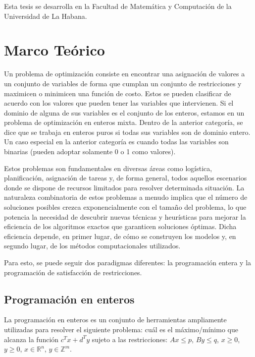 \documentclass[12pt]{report}
\begin{document}
Esta tesis se desarrolla en la Facultad de Matemática y Computación de la Universidad de La Habana.  \\

\chapter{Marco Teórico}

Un problema de optimización consiste en encontrar una asignación de valores a un conjunto de variables de forma que cumplan un conjunto de restricciones y maximicen o minimicen una función de costo. Estos se pueden clasificar de acuerdo con los valores que pueden tener las variables que intervienen. Si el dominio de alguna de sus variables es el conjunto de los enteros, estamos en un problema de optimización en enteros mixta. Dentro de la anterior categoría, se dice que se trabaja en enteros puros si todas sus variables son de dominio entero. Un caso especial en la anterior categoría es cuando todas las variables son binarias (pueden adoptar solamente 0 o 1 como valores).

Estos problemas son fundamentales en diversas áreas como logística, planificación, asignación de tareas y, de forma general, todos aquellos escenarios donde se dispone de recursos limitados para resolver determinada situación. La naturaleza combinatoria de estos problemas a menudo implica que el número de soluciones posibles crezca exponencialmente con el tamaño del problema, lo que potencia la necesidad de descubrir nuevas técnicas y heurísticas para mejorar la eficiencia de los algoritmos exactos que garanticen soluciones óptimas. Dicha eficiencia depende, en primer lugar, de cómo se construyen los modelos y, en segundo lugar, de los métodos computacionales utilizados. 

Para esto, se puede seguir dos paradigmas diferentes: la programación entera y la programación de satisfacción de restricciones.

\section{Programación en enteros}

La programación en enteros es un conjunto de herramientas ampliamente utilizadas para resolver el siguiente problema: cuál es el máximo/mínimo que alcanza la función $c^Tx+d^Ty$ sujeto a las restricciones: $Ax\leq p$, $By\leq q$, $x\geq 0$, $y\geq 0$, $x\in \mathbb{R} ^n$, $y\in \mathbb{Z}^m$.  
\end{document}
